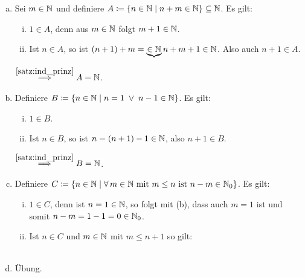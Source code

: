 \documentclass[../ana1.tex]{subfiles}
\begin{document}
\begin{bew}\leavevmode
	\begin{enumerate}[(a)]
		\item Sei \(m \in \mathbb{N} \) und definiere \(A \coloneqq \{n \in \mathbb{N}  \; \vert  \; n + m \in \mathbb{N}\} \subseteq \mathbb{N} \). Es gilt:
			  \begin{enumerate}[(i)]
				\item \(1 \in A \), denn aus \(m \in \mathbb{N} \) folgt \(m + 1 \in \mathbb{N} \).
				\item Ist \(n \in A \), so ist \((n + 1) + m = \underbrace{\in \mathbb{N}}{n + m} + 1 \in \mathbb{N} \).
					  Also auch \(n + 1 \in A \).
			  \end{enumerate}
			  \(\overset{\autoref{satz:ind_prinz}}{\implies} A = \N \).
		\item Definiere \(B \coloneqq \{n \in \mathbb{N}  \; \vert  \; n = 1  \; \vee  \; n - 1 \in \mathbb{N}\} \). Es gilt:
			  \begin{enumerate}[(i)]
				\item \(1 \in B \).
				\item Ist \(n \in B \), so ist \(n = (n + 1) - 1 \in \mathbb{N} \), also \(n + 1 \in B \).
			  \end{enumerate}
			  \(\overset{\autoref{satz:ind_prinz}}{\implies} B = \N \).
		\item Definiere \(C \coloneqq \{n \in \mathbb{N}  \; \vert  \; \forall \, m \in \mathbb{N} \text{ mit } m \leq n \text{ ist } n - m \in \mathbb{N}_{0}\} \). Es gilt:
			  \begin{enumerate}[(i)]
				\item \(1 \in C \), denn ist \(n = 1 \in \mathbb{N} \), so folgt mit (b), dass auch \(m = 1 \) ist und somit
					  \(n - m = 1 - 1 = 0 \in \mathbb{N}_{0} \).
				\item Ist \(n \in C \) und \(m \in \mathbb{N} \) mit \(m \leq n + 1 \) so gilt: \\
					   \\
			  \end{enumerate}
		\item Übung.\qedhere
	\end{enumerate}
\end{bew}
\end{document}

